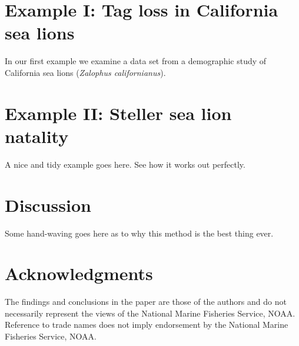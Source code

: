 \documentclass[sts]{imsart}
\numberwithin{equation}{section}
\theoremstyle{plain}
\begin{document}
\section{Example I: Tag loss in California sea lions}

In our first example we examine a data set from a demographic study of California sea lions ({\it Zalophus californianus}). 

\section{Example II: Steller sea lion natality}

A nice and tidy example goes here. See how it works out perfectly.

\section{Discussion}

Some hand-waving goes here as to why this method is the best thing ever.


\section*{Acknowledgments}
The findings and conclusions in the paper are those of the authors and do not necessarily represent the views of the National Marine Fisheries Service, NOAA. Reference to trade names does not imply endorsement by the National Marine Fisheries Service, NOAA.

\begin{supplement}[id=suppA]
\end{supplement}





\clearpage
\end{document}
